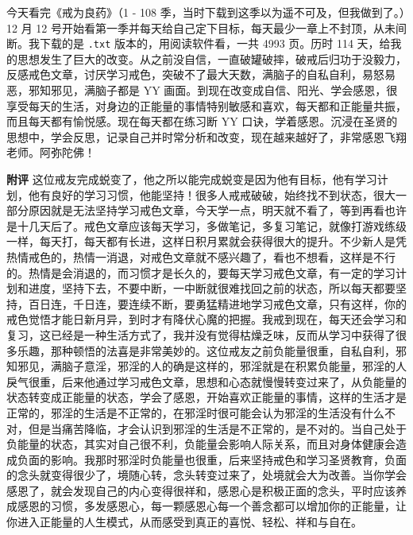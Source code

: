\begin{case}
    今天看完《戒为良药》（1 - 108 季，当时下载到这季以为遥不可及，但我做到了。）12 月 12 号开始看第一季并每天给自己定下目标，每天最少一章上不封顶，从未间断。我下载的是 \texttt{.txt} 版本的，用阅读软件看，一共 4993 页。历时 114 天，给我的思想发生了巨大的改变。从之前没自信，一直破罐破摔，破戒后归功于没毅力，反感戒色文章，讨厌学习戒色，突破不了最大天数，满脑子的自私自利，易怒易恶，邪知邪见，满脑子都是 YY 画面。到现在改变成自信、阳光、学会感恩，很享受每天的生活，对身边的正能量的事情特别敏感和喜欢，每天都和正能量共振，而且每天都有愉悦感。现在每天都在练习断 YY 口诀，学着感恩。沉浸在圣贤的思想中，学会反思，记录自己并时常分析和改变，现在越来越好了，非常感恩飞翔老师。阿弥陀佛！

    \textbf{附评} 这位戒友完成蜕变了，他之所以能完成蜕变是因为他有目标，他有学习计划，他有良好的学习习惯，他能坚持！很多人戒戒破破，始终找不到状态，很大一部分原因就是无法坚持学习戒色文章，今天学一点，明天就不看了，等到再看也许是十几天后了。戒色文章应该每天学习，多做笔记，多复习笔记，就像打游戏练级一样，每天打，每天都有长进，这样日积月累就会获得很大的提升。不少新人是凭热情戒色的，热情一消退，对戒色文章就不感兴趣了，看也不想看，这样是不行的。热情是会消退的，而习惯才是长久的，要每天学习戒色文章，有一定的学习计划和进度，坚持下去，不要中断，一中断就很难找回之前的状态，所以每天都要坚持，百日连，千日连，要连续不断，要勇猛精进地学习戒色文章，只有这样，你的戒色觉悟才能日新月异，到时才有降伏心魔的把握。我戒到现在，每天还会学习和复习，这已经是一种生活方式了，我并没有觉得枯燥乏味，反而从学习中获得了很多乐趣，那种顿悟的法喜是非常美妙的。这位戒友之前负能量很重，自私自利，邪知邪见，满脑子意淫，邪淫的人的确是这样的，邪淫就是在积累负能量，邪淫的人戾气很重，后来他通过学习戒色文章，思想和心态就慢慢转变过来了，从负能量的状态转变成正能量的状态，学会了感恩，开始喜欢正能量的事情，这样的生活才是正常的，邪淫的生活是不正常的，在邪淫时很可能会认为邪淫的生活没有什么不对，但是当痛苦降临，才会认识到邪淫的生活是不正常的，是不对的。当自己处于负能量的状态，其实对自己很不利，负能量会影响人际关系，而且对身体健康会造成负面的影响。我那时邪淫时负能量也很重，后来坚持戒色和学习圣贤教育，负面的念头就变得很少了，境随心转，念头转变过来了，处境就会大为改善。当你学会感恩了，就会发现自己的内心变得很祥和，感恩心是积极正面的念头，平时应该养成感恩的习惯，多发感恩心，每一颗感恩心每一个善念都可以增加你的正能量，让你进入正能量的人生模式，从而感受到真正的喜悦、轻松、祥和与自在。
\end{case}

